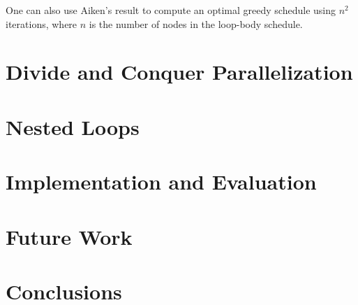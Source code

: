 \documentclass[sigconf, screen, natbib=false, dvipsnames, table]{acmart}
\theoremstyle{definition}
\begin{document}

One can also use Aiken's result to compute an optimal greedy schedule using $n^2$ iterations, where $n$ is the number of nodes 
in the loop-body schedule. 

\section{Divide and Conquer Parallelization}
\label{sec:divide}


\section{Nested Loops}

\section{Implementation and Evaluation}
\label{sec:implementation}


\section{Future Work}
\label{sec:implementation_and_benchmarks}
%
%

\section{Conclusions}
\label{sec:conclusion}
%


\printbibliography

\end{document}
